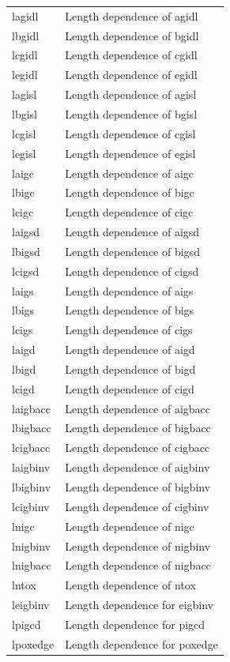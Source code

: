 \begin{longtable}{l l}
{\small lagidl} & {\small Length dependence of agidl} \\
{\small lbgidl} & {\small Length dependence of bgidl} \\
{\small lcgidl} & {\small Length dependence of cgidl} \\
{\small legidl} & {\small Length dependence of egidl} \\
{\small lagisl} & {\small Length dependence of agisl} \\
{\small lbgisl} & {\small Length dependence of bgisl} \\
{\small lcgisl} & {\small Length dependence of cgisl} \\
{\small legisl} & {\small Length dependence of egisl} \\
{\small laigc} & {\small Length dependence of aigc} \\
{\small lbigc} & {\small Length dependence of bigc} \\
{\small lcigc} & {\small Length dependence of cigc} \\
{\small laigsd} & {\small Length dependence of aigsd} \\
{\small lbigsd} & {\small Length dependence of bigsd} \\
{\small lcigsd} & {\small Length dependence of cigsd} \\
{\small laigs} & {\small Length dependence of aigs} \\
{\small lbigs} & {\small Length dependence of bigs} \\
{\small lcigs} & {\small Length dependence of cigs} \\
{\small laigd} & {\small Length dependence of aigd} \\
{\small lbigd} & {\small Length dependence of bigd} \\
{\small lcigd} & {\small Length dependence of cigd} \\
{\small laigbacc} & {\small Length dependence of aigbacc} \\
{\small lbigbacc} & {\small Length dependence of bigbacc} \\
{\small lcigbacc} & {\small Length dependence of cigbacc} \\
{\small laigbinv} & {\small Length dependence of aigbinv} \\
{\small lbigbinv} & {\small Length dependence of bigbinv} \\
{\small lcigbinv} & {\small Length dependence of cigbinv} \\
{\small lnigc} & {\small Length dependence of nigc} \\
{\small lnigbinv} & {\small Length dependence of nigbinv} \\
{\small lnigbacc} & {\small Length dependence of nigbacc} \\
{\small lntox} & {\small Length dependence of ntox} \\
{\small leigbinv} & {\small Length dependence for eigbinv} \\
{\small lpigcd} & {\small Length dependence for pigcd} \\
{\small lpoxedge} & {\small Length dependence for poxedge} \\


\end{longtable}
